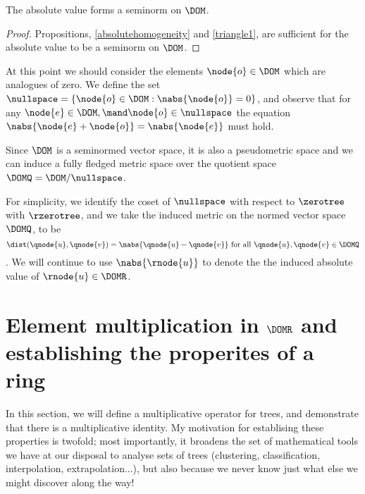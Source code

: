 \begin{corollary}\label{gseminorm}
  The absolute value forms a seminorm on $\DOM$.
  \begin{proof}  
    Propositions, \ref{absolutehomogeneity} and \ref{triangle1}, are 
    sufficient for the absolute value to be a seminorm on
    $\DOM$.
  \end{proof}
\end{corollary}

At this point we should consider the elements
$\node{o} \in \DOM$
which are analogues of zero. We define the set
$\nullspace =\{\node{o}\in\DOM : \nabs{\node{o}} = 0\}$,
and observe that for any
$\node{e} \in \DOM, \mand \node{o} \in \nullspace$
the equation
$\nabs{\node{e} + \node{o}} = \nabs{\node{e}}$
must hold. 

Since $\DOM$ is a seminormed vector space, it is also a pseudometric
space and we can induce a fully fledged metric space over the quotient
space $\DOMQ = \DOM / \nullspace$.

For simplicity, we identify the coset of $\nullspace$ with respect to
$\zerotree$ with $\rzerotree$, and we take the induced metric on the
normed vector space $\DOMQ$, to be
\[\dist(\qnode{u},\qnode{v}) =
\nabs{\qnode{u} - \qnode{v}} \text{ for all }\qnode{u}, \qnode{v} \in
\DOMQ\].  We will continue to use \(\nabs{\rnode{u}}\) to denote the
the induced absolute value of \(\rnode{u}\in\DOMR\).




\section{Element multiplication in $\DOMR$ and establishing the
  properites of a ring}

In this section, we will define a multiplicative operator for trees, and
demonstrate that there is a multiplicative identity.  My motivation for establising
these properties is twofold; most importantly, it broadens the set of
mathematical tools we have at our disposal to analyse sets of trees
(clustering, classification, interpolation, extrapolation...), but
also because we never know just what else we might discover along the
way!

